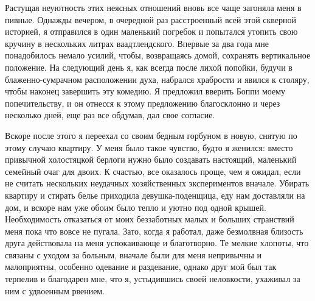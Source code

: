 Растущая  неуютность этих  неясных отношений  вновь все  чаще загоняла
меня в пивные. Однажды вечером, в очередной раз расстроенный всей этой
скверной историей, я отправился в  один маленький погребок и попытался
утопить свою  кручину в  нескольких литрах ваадтлендского.  Впервые за
два  года мне  понадобилось немало  усилий, чтобы,  возвращаясь домой,
сохранять  вертикальное положение.  На  следующий день  я, как  всегда
после лихой  попойки, будучи  в блаженно-сумрачном  расположении духа,
набрался храбрости  и явился  к столяру,  чтобы наконец  завершить эту
комедию. Я предложил вверить Боппи  моему попечительству, и он отнесся
к этому предложению  благосклонно и через несколько дней,  еще раз все
обдумав, дал свое согласие.

Вскоре после этого я переехал со своим бедным горбуном в новую, снятую
по этому случаю квартиру. У меня  было такое чувство, будто я женился:
вместо привычной  холостяцкой берлоги нужно было  создавать настоящий,
маленький семейный  очаг для  двоих. К  счастью, все  оказалось проще,
чем  я  ожидал, если  не  считать  нескольких неудачных  хозяйственных
экспериментов  вначале. Убирать  квартиру  и  стирать белье  приходила
девушка-поденщица, еду нам  доставляли на дом, и вскоре  нам уже обоим
было тепло и уютно под  одной крышей. Необходимость отказаться от моих
беззаботных малых и больших странствий  меня пока что вовсе не пугала.
Зато, когда я  работал, даже безмолвная близость  друга действовала на
меня  успокаивающе и  благотворно. Те  мелкие хлопоты,  что связаны  с
уходом за  больным, вначале  были для  меня непривычны  и малоприятны,
особенно одевание  и раздевание,  однако друг мой  был так  терпелив и
благодарен мне, что я, устыдившись своей неловкости, ухаживал за ним с
удвоенным рвением.

